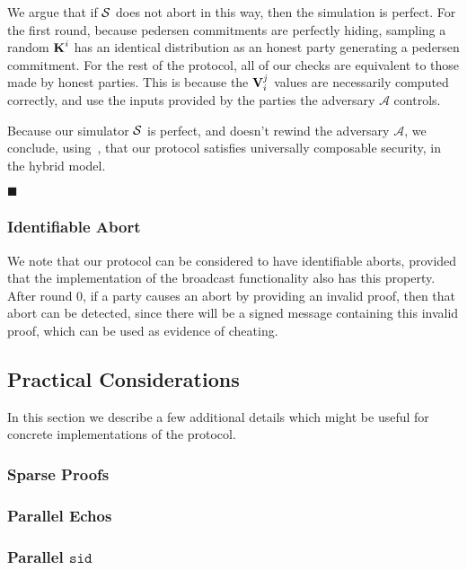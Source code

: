 We argue that if $\mathcal{S}$ does not abort in this way, then the simulation
is perfect. For the first round, because pedersen commitments
are perfectly hiding, sampling a random $\textbf{K}^i$ has an identical
distribution as an honest party generating a pedersen commitment.
For the rest of the protocol, all of our checks are equivalent
to those made by honest parties. This is because the
$\textbf{V}^j_i$ values are necessarily computed correctly, and use
the inputs provided by the parties the adversary $\mathcal{A}$ controls.

Because our simulator $\mathcal{S}$ is perfect, and doesn't
rewind the adversary $\mathcal{A}$, we conclude,
using~\cite{kushilevitz_information-theoretically_2009},
that our protocol
satisfies universally composable security, in the hybrid model.

$\blacksquare$

\subsubsection{Identifiable Abort}

We note that our protocol can be considered to have identifiable
aborts, provided that the implementation of the broadcast functionality
also has this property.
After round $0$, if a party causes an abort by providing an invalid
proof, then that abort can be detected, since there will be
a signed message containing this invalid proof, which can be used
as evidence of cheating.

\subsection{Practical Considerations}

In this section we describe a few additional details which might
be useful for concrete implementations of the protocol.

\subsubsection{Sparse Proofs}

\subsubsection{Parallel Echos}

\subsubsection{Parallel $\texttt{sid}$}

